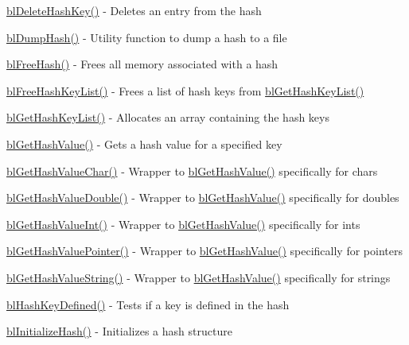 \begin{DoxyItemize}
\item \hyperlink{hash_8c_af8f2913c2050be1150d1d40ae4492f3c}{bl\-Delete\-Hash\-Key()} -\/ Deletes an entry from the hash
\item \hyperlink{hash_8c_a7b5b0f404d2dedd44aaafb0687d216a8}{bl\-Dump\-Hash()} -\/ Utility function to dump a hash to a file
\item \hyperlink{hash_8c_a3d44b7c155f0ee150a1e22df1f093ac6}{bl\-Free\-Hash()} -\/ Frees all memory associated with a hash
\item \hyperlink{hash_8c_a4009ec93242c1f1b5663ac3885e9d9f8}{bl\-Free\-Hash\-Key\-List()} -\/ Frees a list of hash keys from \hyperlink{hash_8c_aca7e169510f7bb87f8a462b80557f75b}{bl\-Get\-Hash\-Key\-List()}
\item \hyperlink{hash_8c_aca7e169510f7bb87f8a462b80557f75b}{bl\-Get\-Hash\-Key\-List()} -\/ Allocates an array containing the hash keys
\item \hyperlink{hash_8c_a0af910db68a6dc7a052a39f62df76515}{bl\-Get\-Hash\-Value()} -\/ Gets a hash value for a specified key
\item \hyperlink{hash_8c_adfee28c95e93c425df93387b70e5fb36}{bl\-Get\-Hash\-Value\-Char()} -\/ Wrapper to \hyperlink{hash_8c_a0af910db68a6dc7a052a39f62df76515}{bl\-Get\-Hash\-Value()} specifically for chars
\item \hyperlink{hash_8c_af40ea09b8c44bfb43762dab3aa802502}{bl\-Get\-Hash\-Value\-Double()} -\/ Wrapper to \hyperlink{hash_8c_a0af910db68a6dc7a052a39f62df76515}{bl\-Get\-Hash\-Value()} specifically for doubles
\item \hyperlink{hash_8c_a37ac90d036a845c4b115df925dcf7090}{bl\-Get\-Hash\-Value\-Int()} -\/ Wrapper to \hyperlink{hash_8c_a0af910db68a6dc7a052a39f62df76515}{bl\-Get\-Hash\-Value()} specifically for ints
\item \hyperlink{hash_8c_a05d5450073761d5885fb138293c2983f}{bl\-Get\-Hash\-Value\-Pointer()} -\/ Wrapper to \hyperlink{hash_8c_a0af910db68a6dc7a052a39f62df76515}{bl\-Get\-Hash\-Value()} specifically for pointers
\item \hyperlink{hash_8c_a8d75315373bc094431948d6421548604}{bl\-Get\-Hash\-Value\-String()} -\/ Wrapper to \hyperlink{hash_8c_a0af910db68a6dc7a052a39f62df76515}{bl\-Get\-Hash\-Value()} specifically for strings
\item \hyperlink{hash_8c_a7ad162562d0d4f0d67701595b6ca21f4}{bl\-Hash\-Key\-Defined()} -\/ Tests if a key is defined in the hash
\item \hyperlink{hash_8c_a488624eced413f969a14b4a70e5f61ed}{bl\-Initialize\-Hash()} -\/ Initializes a hash structure

\end{DoxyItemize}

